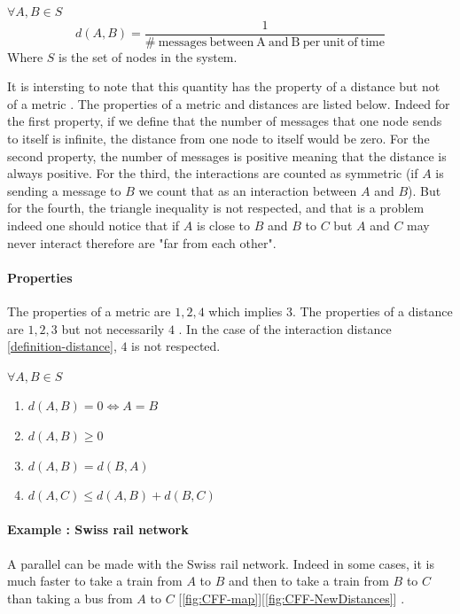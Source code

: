 \documentclass[a4paper,11pt,twoside=semi,openright]{report}
\begin{document}
$\forall A, B \in S$
\begin{equation} \label{definition-distance}
 d(A,B) = \frac{1}{ \mathrm{\#\ messages\ between\ A\ and\ B\ per\ unit\ of\ time} } 
\end{equation}
Where $S$ is the set of nodes in the system.

It is intersting to note that this quantity has the property of a distance but not of a metric
\cite{Greenhoe2016}. The properties of a metric and distances are listed below.
Indeed for the first property, if we define that the number of messages that one node
sends to itself is infinite, the distance from one node to itself would be
zero. For the second property, the number of messages is positive meaning that the distance is always positive. For the third, the interactions are counted as symmetric (if $A$ is
sending a message to $B$ we count that as an interaction between $A$ and $B$).
But for the fourth, the triangle inequality is not respected, and that is a
problem indeed one should notice that if $A$ is close to $B$ and $B$ to $C$ but
$A$ and $C$ may never interact therefore are "far from each other".  

\paragraph{Properties} The properties of a metric are $1, 2, 4$ which implies
$3$. The properties of a distance are $1,2,3$ but not necessarily $4$
\cite{Greenhoe2016}. In the case of the interaction distance
\autoref{definition-distance}, $4$ is not respected.

$\forall A,B \in S$
\begin{enumerate}
\item $d(A,B) = 0 \Leftrightarrow A = B$
\item $d(A,B) \geq 0$
\item $d(A,B) = d(B,A)$
 \color{red} \item$d(A, C) \leq d(A,B) + d(B,C)$ \color{black}
\end{enumerate}

\paragraph{Example : Swiss rail network}
A parallel can be made with the Swiss rail network. Indeed in some cases, it is much
faster to take a train from $A$ to $B$ and then to take a train from $B$ to $C$
than taking a bus from $A$ to $C$ [\autoref{fig:CFF-map}][\autoref{fig:CFF-NewDistances}] . 
\end{document}
